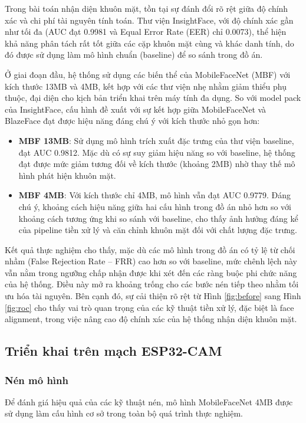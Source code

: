 Trong bài toán nhận diện khuôn mặt, tồn tại sự đánh đổi rõ rệt giữa độ chính xác và chi phí tài nguyên tính toán. Thư viện InsightFace, với độ chính xác gần như tối đa (AUC đạt 0.9981 và Equal Error Rate (EER) chỉ 0.0073), thể hiện khả năng phân tách rất tốt giữa các cặp khuôn mặt cùng và khác danh tính, do đó được sử dụng làm mô hình chuẩn (baseline) để so sánh trong đồ án.

Ở giai đoạn đầu, hệ thống sử dụng các biến thể của MobileFaceNet (MBF) với kích thước 13MB và 4MB, kết hợp với các thư viện nhẹ nhằm giảm thiểu phụ thuộc, đại diện cho kịch bản triển khai trên máy tính đa dụng. So với model pack của InsightFace, cấu hình đề xuất với sự kết hợp giữa MobileFaceNet và BlazeFace đạt được hiệu năng đáng chú ý với kích thước nhỏ gọn hơn:
\begin{itemize}
\item \textbf{MBF 13MB}: Sử dụng mô hình trích xuất đặc trưng của thư viện baseline, đạt AUC 0.9812. Mặc dù có sự suy giảm hiệu năng so với baseline, hệ thống đạt được mức giảm tương đối về kích thước (khoảng 2MB) nhờ thay thế mô hình phát hiện khuôn mặt.
\item \textbf{MBF 4MB}: Với kích thước chỉ 4MB, mô hình vẫn đạt AUC 0.9779. Đáng chú ý, khoảng cách hiệu năng giữa hai cấu hình trong đồ án nhỏ hơn so với khoảng cách tương ứng khi so sánh với baseline, cho thấy ảnh hưởng đáng kể của pipeline tiền xử lý và căn chỉnh khuôn mặt đối với chất lượng đặc trưng.
\end{itemize}

Kết quả thực nghiệm cho thấy, mặc dù các mô hình trong đồ án có tỷ lệ từ chối nhầm (False Rejection Rate – FRR) cao hơn so với baseline, mức chênh lệch này vẫn nằm trong ngưỡng chấp nhận được khi xét đến các ràng buộc phi chức năng của hệ thống. Điều này mở ra khoảng trống cho các bước nén tiếp theo nhằm tối ưu hóa tài nguyên. Bên cạnh đó, sự cải thiện rõ rệt từ Hình \ref{fig:before} sang Hình \ref{fig:roc} cho thấy vai trò quan trọng của các kỹ thuật tiền xử lý, đặc biệt là face alignment, trong việc nâng cao độ chính xác của hệ thống nhận diện khuôn mặt.
\subsection{Triển khai trên mạch ESP32-CAM}
\subsubsection{Nén mô hình}
Để đánh giá hiệu quả của các kỹ thuật nén, mô hình MobileFaceNet 4MB được sử dụng làm cấu hình cơ sở trong toàn bộ quá trình thực nghiệm.
